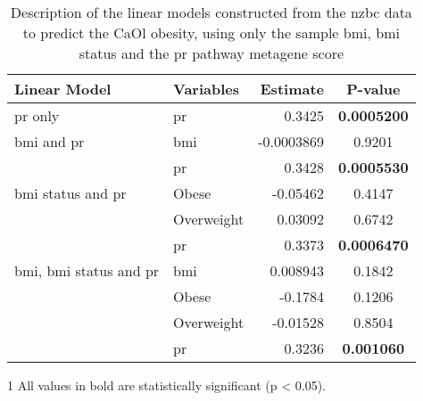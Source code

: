 	\begin{table}[htpb]
		\centering
		\caption[Description of the linear models constructed from the \gls{nzbc} data to predict the CaOl obesity, using only the sample \gls{bmi}, \gls{bmi} status and the \acrshort{pr} pathway metagene score]{Description of the linear models constructed from the \gls{nzbc} data to predict the CaOl obesity, using only the sample \gls{bmi}, \gls{bmi} status and the \gls{pr} pathway metagene score}
		\label{tab:lm_pr_only_caol}
		\begin{threeparttable}
			\begin{tabular}{llrc}
				Linear Model & Variables & Estimate & {P-value}\\
					\hline
					\hline
					\rule{0pt}{2.25ex}\gls{pr} only                            & \gls{pr}   & 0.3425     & \bfseries 0.0005200  \tnote{1}\\
					\hline
					\rule{0pt}{2.25ex}\gls{bmi} and \gls{pr}                   & \gls{bmi}  & -0.0003869 & 0.9201    \\
                                                                               & \gls{pr}   & 0.3428     & \bfseries 0.0005530  \\
					\hline
					\rule{0pt}{2.25ex}\gls{bmi} status and \gls{pr}            & Obese      & -0.05462   & 0.4147    \\
                                                                               & Overweight & 0.03092    & 0.6742    \\
                                                                               & \gls{pr}   & 0.3373     & \bfseries 0.0006470  \\
					\hline
					\rule{0pt}{2.25ex}\gls{bmi}, \gls{bmi} status and \gls{pr} & \gls{bmi}  & 0.008943   & 0.1842    \\
                                                                               & Obese      & -0.1784    & 0.1206    \\
                                                                               & Overweight & -0.01528   & 0.8504    \\
                                                                               & \gls{pr}   & 0.3236     & \bfseries 0.001060   \\
					\hline
					\hline
			\end{tabular}
				\begin{tablenotes}
					\begin{footnotesize}
					\item [1] All values in bold are statistically significant (p \textless{} 0.05).
					\end{footnotesize}
				\end{tablenotes}
		\end{threeparttable}
	\end{table}

